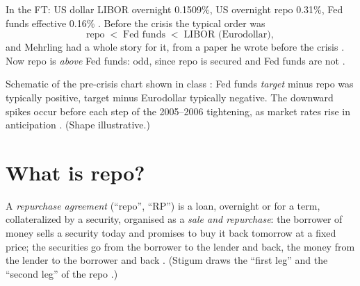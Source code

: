 \begin{paracol}{2}
In the FT: US dollar LIBOR overnight 0.1509\%, US overnight repo 0.31\%, Fed funds effective 0.16\% . Before the crisis
the typical order was
\[
  \text{repo} \;<\; \text{Fed funds} \;<\; \text{LIBOR (Eurodollar)} ,
\]
and Mehrling had a whole story for it, from a paper he wrote before the crisis . Now repo is \emph{above} Fed funds:
odd, since repo is secured and Fed funds are not .

\begin{nfigure}
\caption{Schematic of the pre-crisis chart shown in class : Fed funds \emph{target} minus repo was typically positive, target
minus Eurodollar typically negative. The downward spikes occur before each step of the 2005--2006 tightening, as market rates rise in anticipation
. (Shape illustrative.)}\label{fig:rp-spreads}
\end{nfigure}

\section{What is repo?}\label{sec:rp-what}

\begin{definition}\label{def:rp}
A \emph{repurchase agreement} (``repo'', ``RP'') is a loan, overnight or for a term, collateralized by a security, organised as a
\emph{sale and repurchase}: the borrower of money sells a security today and promises to buy it back tomorrow at a fixed price; the securities go
from the borrower to the lender and back, the money from the lender to the borrower and back .
(Stigum draws the ``first leg'' and the ``second leg'' of the repo .)
\end{definition}


\end{paracol}
